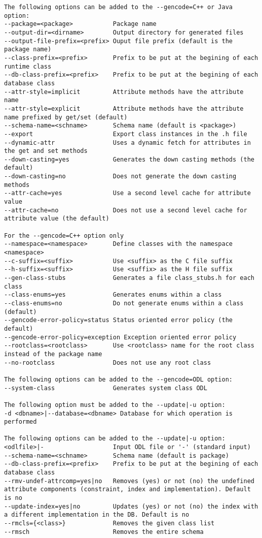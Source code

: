 \begin{verbatim}
The following options can be added to the --gencode=C++ or Java option:
--package=<package>           Package name
--output-dir=<dirname>        Output directory for generated files
--output-file-prefix=<prefix> Ouput file prefix (default is the package name)
--class-prefix=<prefix>       Prefix to be put at the begining of each runtime class
--db-class-prefix=<prefix>    Prefix to be put at the begining of each database class
--attr-style=implicit         Attribute methods have the attribute name
--attr-style=explicit         Attribute methods have the attribute name prefixed by get/set (default)
--schema-name=<schname>       Schema name (default is <package>)
--export                      Export class instances in the .h file
--dynamic-attr                Uses a dynamic fetch for attributes in the get and set methods
--down-casting=yes            Generates the down casting methods (the default)
--down-casting=no             Does not generate the down casting methods
--attr-cache=yes              Use a second level cache for attribute value
--attr-cache=no               Does not use a second level cache for attribute value (the default)

For the --gencode=C++ option only
--namespace=<namespace>       Define classes with the namespace <namespace>
--c-suffix=<suffix>           Use <suffix> as the C file suffix
--h-suffix=<suffix>           Use <suffix> as the H file suffix
--gen-class-stubs             Generates a file class_stubs.h for each class
--class-enums=yes             Generates enums within a class
--class-enums=no              Do not generate enums within a class (default)
--gencode-error-policy=status Status oriented error policy (the default)
--gencode-error-policy=exception Exception oriented error policy
--rootclass=<rootclass>       Use <rootclass> name for the root class instead of the package name
--no-rootclass                Does not use any root class

The following options can be added to the --gencode=ODL option:
--system-class                Generates system class ODL

The following option must be added to the --update|-u option:
-d <dbname>|--database=<dbname> Database for which operation is performed

The following options can be added to the --update|-u option:
<odlfile>|-                   Input ODL file or '-' (standard input)
--schema-name=<schname>       Schema name (default is package)
--db-class-prefix=<prefix>    Prefix to be put at the begining of each database class
--rmv-undef-attrcomp=yes|no   Removes (yes) or not (no) the undefined attribute components (constraint, index and implementation). Default is no
--update-index=yes|no         Updates (yes) or not (no) the index with a different implementation in the DB. Default is no
--rmcls={<class>}             Removes the given class list
--rmsch                       Removes the entire schema


\end{verbatim}
